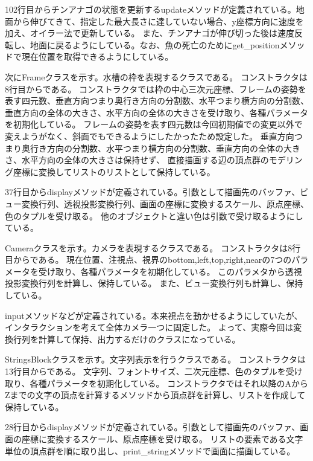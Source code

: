 \documentclass[uplatex,dvipdfmx]{jsarticle}
\begin{document}
102行目からチンアナゴの状態を更新するupdateメソッドが定義されている。地面から伸びてきて、指定した最大長さに達していない場合、y座標方向に速度を加え、オイラー法で更新している。
また、チンアナゴが伸び切った後は速度反転し、地面に戻るようにしている。なお、魚の死亡のためにget\_positionメソッドで現在位置を取得できるようにしている。



次にFrameクラスを示す。水槽の枠を表現するクラスである。
コンストラクタは8行目からである。
コンストラクタでは枠の中心三次元座標、フレームの姿勢を表す四元数、垂直方向つまり奥行き方向の分割数、水平つまり横方向の分割数、垂直方向の全体の大きさ、水平方向の全体の大きさを受け取り、各種パラメータを初期化している。
フレームの姿勢を表す四元数は今回初期値での変更以外で変えようがなく、斜面でもできるようにしたかったため設定した。
垂直方向つまり奥行き方向の分割数、水平つまり横方向の分割数、垂直方向の全体の大きさ、水平方向の全体の大きさは保持せず、
直接描画する辺の頂点群のモデリング座標に変換してリストのリストとして保持している。

37行目からdisplayメソッドが定義されている。引数として描画先のバッファ、ビュー変換行列、透視投影変換行列、画面の座標に変換するスケール、原点座標、色のタプルを受け取る。
他のオブジェクトと違い色は引数で受け取るようにしている。



Cameraクラスを示す。カメラを表現するクラスである。
コンストラクタは8行目からである。
現在位置、注視点、視界のbottom,left,top,right,nearの7つのパラメータを受け取り、各種パラメータを初期化している。
このパラメタから透視投影変換行列を計算し、保持している。
また、ビュー変換行列も計算し、保持している。

inputメソッドなどが定義されている。本来視点を動かせるようにしていたが、インタラクションを考えて全体カメラ一つに固定した。
よって、実際今回は変換行列を計算して保持、出力するだけのクラスになっている。



StringsBlockクラスを示す。文字列表示を行うクラスである。
コンストラクタは13行目からである。
文字列、フォントサイズ、二次元座標、色のタプルを受け取り、各種パラメータを初期化している。
コンストラクタではそれ以降のAからZまでの文字の頂点を計算するメソッドから頂点群を計算し、リストを作成して保持している。

28行目からdisplayメソッドが定義されている。引数として描画先のバッファ、画面の座標に変換するスケール、原点座標を受け取る。
リストの要素である文字単位の頂点群を順に取り出し、print\_stringメソッドで画面に描画している。
\end{document}
